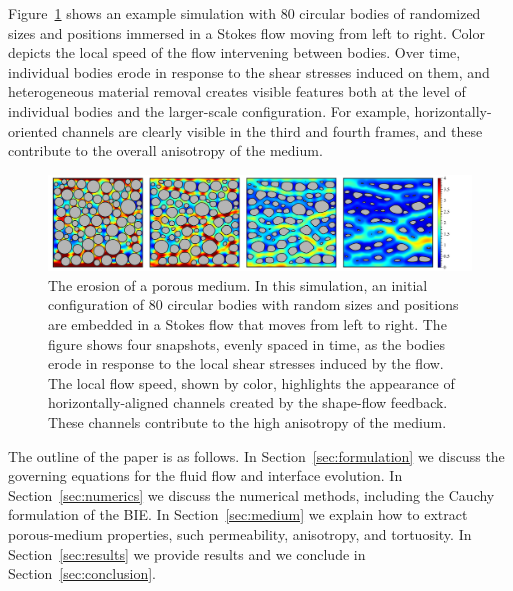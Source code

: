 \documentclass[3p]{elsarticle}
\begin{document}
Figure~\ref{fig1} shows an example simulation with 80 circular bodies of randomized sizes and positions immersed in a Stokes flow moving from left to right. 
Color depicts the local speed of the flow intervening between bodies. Over time, individual bodies erode in response to the shear stresses induced on them, and heterogeneous material removal creates visible features both at the level of individual bodies and the larger-scale configuration. For example, horizontally-oriented channels are clearly visible in the third and fourth frames, and these contribute to the overall anisotropy of the medium.



\begin{figure}%
\centering
\includegraphics[width = 0.99 \textwidth]{./figs/Velocity-80-4.pdf}
\caption{The erosion of a porous medium. In this simulation, an initial configuration of 80 circular bodies with random sizes and positions are embedded in a Stokes flow that moves from left to right. The figure shows four snapshots, evenly spaced in time, as the bodies erode in response to the local shear stresses induced by the flow. The local flow speed, shown by color, highlights the appearance of horizontally-aligned channels created by the shape-flow feedback. These channels contribute to the high anisotropy of the medium.
\label{fig1}
}
\end{figure}

The outline of the paper is as follows. In Section~\ref{sec:formulation}
we discuss the governing equations for the fluid flow and interface
evolution. In Section~\ref{sec:numerics} we discuss the numerical methods, including the Cauchy formulation of the BIE. In Section~\ref{sec:medium} we explain how to extract porous-medium properties, such permeability, anisotropy, and tortuosity. In Section~\ref{sec:results} we provide results and we conclude in Section~\ref{sec:conclusion}.
\end{document}
